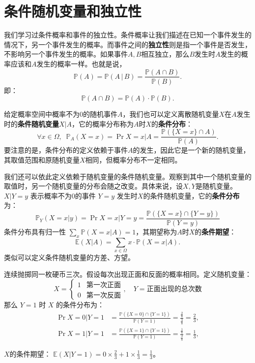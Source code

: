 \documentclass[12pt,UTF8,fontset=none]{ctexbook}
\begin{document}
\section{条件随机变量和独立性}

我们学习过条件概率和事件的独立性。条件概率让我们描述在已知一个事件发生的情况下，另一个事件发生的概率。而事件之间的\textbf{独立性}则是指一个事件是否发生，不影响另一个事件发生的概率。如果事件$A,B$相互独立，那么$B$发生时$A$发生的概率应该和$A$发生的概率一样。也就是说，
$$\mathbb{P}(A) = \mathbb{P}(A \, | \, B) = \frac{\mathbb{P}(A \cap B)}{\mathbb{P}(B)}.$$
即：
$$\mathbb{P}(A \cap B) = \mathbb{P}(A) \cdot \mathbb{P}(B).$$

给定概率空间中概率不为$0$的随机事件$A$，我们也可以定义离散随机变量$X$在$A$发生时的\textbf{条件随机变量}$X|A$，它的概率分布称为$A$时$X$的\textbf{条件分布}：
\[
\forall x \in \Omega,\;\;
\mathbb{P}_{A}(X = x) = \Pr{X=x | A} = \frac{\mathbb{P}(\{X = x\}\cap A)}{\mathbb{P}(A)}.
\]
要注意的是，条件分布的定义依赖于事件$A$的发生，因此它是一个新的随机变量，其取值范围和原随机变量$X$相同，但概率分布不一定相同。

我们还可以依此定义依赖于随机变量的条件随机变量。观察到其中一个随机变量的取值时，另一个随机变量的分布会随之改变。具体来说，设$X,Y$是随机变量。\(X|Y=y\) 表示概率不为$0$的事件 \(Y=y\) 发生时$X$的条件随机变量，它的\textbf{条件分布}为：
\[
\mathbb{P}_{Y}(X=x|y) = \Pr{X=x | Y=y} = \frac{\mathbb{P}(\{X=x\}\cap\{Y=y\})}{\mathbb{P}(Y=y)}
\]
条件分布具有归一性 \(\sum_x \mathbb{P}(X=x|A) = 1\)，其期望称为$A$时$X$的\textbf{条件期望}：
\[
\mathbb{E}(X|A) = \sum_{x\in \Omega} x \cdot \mathbb{P}(X=x|A).
\]
类似可以定义条件随机变量的方差、方望。

\begin{ex}
连续抛掷同一枚硬币三次。假设每次出现正面和反面的概率相同。定义随机变量：
\[
X = \begin{cases} 1 & \text{第一次正面} \\ 0 & \text{第一次反面} \end{cases}, \quad 
Y = \text{正面出现的总次数}
\]
那么 \(Y=1\) 时 \(X\) 的条件分布为：
\begin{align*}
    \Pr{X=0|Y=1} &= \frac{\mathbb{P}(\{X=0\}\cap\{Y=1\})}{\mathbb{P}(Y=1)} = \frac{\frac{2}{8}}{\frac{3}{8}} = \frac{2}{3},\\
    \Pr{X=1|Y=1} &= \frac{\mathbb{P}(\{X=1\}\cap\{Y=1\})}{\mathbb{P}(Y=1)} = \frac{\frac{1}{8}}{\frac{3}{8}} = \frac{1}{3},
\end{align*}

$X$的条件期望： \(\displaystyle\mathbb{E}(X|Y=1) = 0 \times \frac{2}{3} + 1 \times \frac{1}{3} = \frac{1}{3}\)。
\end{ex}
\end{document}
